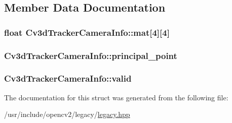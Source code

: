 \subsection{Member Data Documentation}
\hypertarget{structCv3dTrackerCameraInfo_a73da8b3a6d20e7857eeb4eb68bce974c}{
\subsubsection[{mat}]{\setlength{\rightskip}{0pt plus 5cm}float Cv3d\-Tracker\-Camera\-Info\-::mat\mbox{[}4\mbox{]}\mbox{[}4\mbox{]}}}\label{structCv3dTrackerCameraInfo_a73da8b3a6d20e7857eeb4eb68bce974c}
\hypertarget{structCv3dTrackerCameraInfo_a95df78ef4b1e23eb238fe8544d06b322}{
\subsubsection[{principal\-\_\-point}]{ Cv3d\-Tracker\-Camera\-Info\-::principal\-\_\-point}}\label{structCv3dTrackerCameraInfo_a95df78ef4b1e23eb238fe8544d06b322}
\hypertarget{structCv3dTrackerCameraInfo_adc4a63ad78f2d9eda45418c1a37cc3f2}{
\subsubsection[{valid}]{ Cv3d\-Tracker\-Camera\-Info\-::valid}}\label{structCv3dTrackerCameraInfo_adc4a63ad78f2d9eda45418c1a37cc3f2}


The documentation for this struct was generated from the following file\-:\begin{DoxyCompactItemize}
\item 
/usr/include/opencv2/legacy/\hyperlink{legacy_8hpp}{legacy.\-hpp}\end{DoxyCompactItemize}
